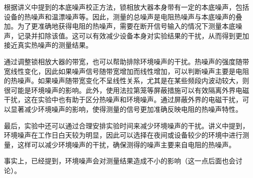 根据讲义中提到的本底噪声校正方法，锁相放大器本身带有一定的本底噪声，包括设备的热噪声和温漂噪声等。因此，测量的总噪声是电阻热噪声与本底噪声的叠加。为了更准确地获得电阻的热噪声，需要在断开信号输入的情况下测量本底噪声，记录并扣除该值。这可以有效减少设备本身对实验结果的干扰，从而得到更加接近真实热噪声的测量结果。

通过调整锁相放大器的带宽，也可以帮助排除环境噪声的干扰。热噪声的强度随带宽线性变化，因此如果噪声信号随带宽增加而线性增加，可以判断噪声主要是电阻的热噪声。如果噪声随带宽变化不呈线性关系，尤其是在某些频段内波动较大，则很可能是环境噪声的影响。此外，使用法拉第笼等屏蔽措施可以有效隔离外界电磁干扰，这在实验中也有助于区分热噪声和环境噪声。通过屏蔽外界的电磁干扰，可以显著减少环境噪声的影响，使得测量的信号更加准确反映电阻的热噪声特性。

最后，实验中还可以通过合理安排实验时间来减少环境噪声的干扰。讲义中提到，环境噪声在工作日白天较为明显，因此可以选择在夜间或设备较少的环境中进行测量，这样可以减少环境噪声的干扰，确保测得的噪声主要来自电阻的热噪声。

事实上，\cite{c}已经提到，环境噪声会对测量结果造成不小的影响（这一点后面也会讨论）。
